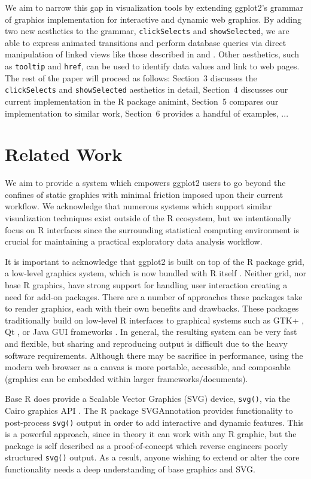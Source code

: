 \documentclass[journal]{vgtc}\usepackage[]{graphicx}\usepackage[]{color}
\begin{document}
We aim to narrow this gap in visualization tools by extending ggplot2's grammar of graphics implementation for interactive and dynamic web graphics. By adding two new aesthetics to the grammar, \texttt{clickSelects} and \texttt{showSelected}, we are able to express animated transitions and perform database queries via direct manipulation of linked views like those described in \citep{Ahlberg:1991} and \citep{Buja:1991vh}. Other aesthetics, such as \texttt{tooltip} and \texttt{href}, can be used to identify data values and link to web pages. The rest of the paper will proceed as follows: Section~3 discusses the \texttt{clickSelects} and \texttt{showSelected} aesthetics in detail, Section~4 discusses our current implementation in the R package animint, Section~5 compares our implementation to similar work, Section~6 provides a handful of examples, ...


\section{Related Work}

We aim to provide a system which empowers ggplot2 users to go beyond the confines of static graphics with minimal friction imposed upon their current workflow. We acknowledge that numerous systems which support similar visualization techniques exist outside of the R ecosystem, but we intentionally focus on R interfaces since the surrounding statistical computing environment is crucial for maintaining a practical exploratory data analysis workflow.

It is important to acknowledge that ggplot2 is built on top of the R package grid, a low-level graphics system, which is now bundled with R itself \citep{RCore}. Neither grid, nor base R graphics, have strong support for handling user interaction creating a need for add-on packages. There are a number of approaches these packages take to render graphics, each with their own benefits and drawbacks. These packages traditionally build on low-level R interfaces to graphical systems such as GTK+ \citep{RGtk2}, Qt \citep{qtbase, qtpaint}, or Java GUI frameworks \citep{rJava}. In general, the resulting system can be very fast and flexible, but sharing and reproducing output is difficult due to the heavy software requirements. Although there may be sacrifice in performance, using the modern web browser as a canvas is more portable, accessible, and composable (graphics can be embedded within larger frameworks/documents).

Base R does provide a Scalable Vector Graphics (SVG) device, \texttt{svg()}, via the Cairo graphics API \citep{cairo}. The R package SVGAnnotation \citep{SVGAnnotation} provides functionality to post-process \texttt{svg()} output in order to add interactive and dynamic features. This is a powerful approach, since in theory it can work with any R graphic, but the package is self described as a proof-of-concept which reverse engineers poorly structured \texttt{svg()} output. As a result, anyone wishing to extend or alter the core functionality needs a deep understanding of base graphics and SVG. 
\end{document}
